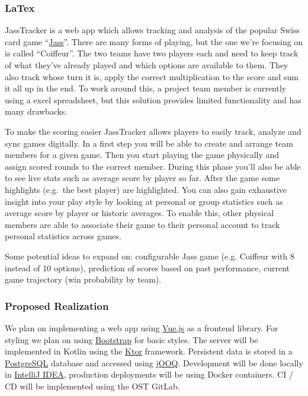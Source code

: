 \subsubsection*{LaTex}

JassTracker is a web app which allows tracking and analysis of the popular Swiss card game ``\href{https://de.wikipedia.org/wiki/Jass}{Jass}''.
There are many forms of playing, but the one we're focusing on is called ``Coiffeur''.
The two teams have two players each and need to keep track of what they've already played and which options are available to them.
They also track whose turn it is, apply the correct multiplication to the score and sum it all up in the end.
To work around this, a project team member is currently using a excel spreadsheet, but this solution provides limited functionality and has many drawbacks.

To make the scoring easier JassTracker allows players to easily track, analyze and sync games digitally.
In a first step you will be able to create and arrange team members for a given game.
Then you start playing the game physically and assign scored rounds to the correct member.
During this phase you'll also be able to see live stats such as average score by player so far.
After the game some highlights (e.g.\ the best player) are highlighted.
You can also gain exhaustive insight into your play style by looking at personal or group statistics such as average score by player or historic averages.
To enable this, other physical members are able to associate their game to their personal account to track personal statistics across games.


Some potential ideas to expand on: configurable Jass game (e.g. Coiffeur with 8 instead of 10 options), prediction of scores based on past performance, current game trajectory (win probability by team).

\subsubsection*{Proposed Realization}

We plan on implementing a web app using \href{https://vuejs.org/}{Vue.js} as a frontend library.
For styling we plan on using \href{https://getbootstrap.com/}{Bootstrap} for basic styles.
The server will be implemented in Kotlin using the \href{https://ktor.io/}{Ktor} framework.
Persistent data is stored in a \href{https://www.postgresql.org/}{PostgreSQL} database and accessed using \href{https://www.jooq.org/}{jOOQ}.
Development will be done locally in \href{https://www.jetbrains.com/idea/}{IntelliJ IDEA}, production deployments will be using Docker containers.
CI / CD will be implemented using the OST GitLab.
